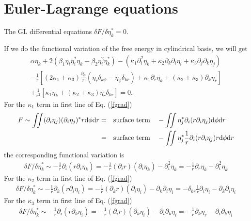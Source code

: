 \documentclass[aps,prl,preprint]{revtex4-2}
\begin{document}
\section{Euler-Lagrange equations}

The GL differential equations $\delta F/\delta\eta_k^*=0$.

If we do the functional variation of the free energy in cylindrical basis, we will get
\begin{align}
    \alpha\eta_k+2(\beta_1\eta_i\eta_i^*\eta_k
    +\beta_2\eta_i^2\eta_k^*)-\left(\kappa_1\partial_i^2\eta_k
    +\kappa_2\partial_k\partial_i\eta_i
    +\kappa_3\partial_j\partial_k\eta_j\right)\nonumber  \\
    -\frac{1}{r}\left[(2\kappa_1+\kappa_3)\frac{\partial_\phi}{r}
        \left(\eta_r\delta_{k\phi}-\eta_\phi\delta_{kr}\right)+\kappa_1\partial_r\eta_k
    +(\kappa_2+\kappa_3)\partial_k\eta_r\right]\nonumber \\
    +\frac{1}{r^2}[\kappa_1\eta_k+(\kappa_2+\kappa_3)\eta_r\delta_{kr}]
    =0.
\end{align}
For the $\kappa_1$ term in first line of Eq. (\ref{fgrad})
\begin{align}\label{surf_term}
    F\sim\iint (\partial_i\eta_j)(\partial_i\eta_j)^* r\dd\phi\dd r
    = & \qq{surface term} - \iint \eta_j^*\partial_i(r\partial_i\eta_j) \dd\phi\dd r             \\
    = & \qq{surface term} - \iint \eta_j^*\frac{1}{r}\partial_i(r\partial_i\eta_j) r\dd\phi\dd r
\end{align}
the corresponding functional variation is
\begin{align}
    \delta F/\delta\eta_k^*\sim-\frac{1}{r}\partial_i(r\partial_i\eta_k)
    =-\frac{1}{r}(\partial_i r)(\partial_i\eta_k)-\partial_i^2\eta_k
    =-\frac{1}{r}\partial_r\eta_k - \partial_i^2\eta_k
\end{align}
For the $\kappa_2$ term in first line of Eq. (\ref{fgrad})
\begin{align}
    \delta F/\delta\eta_k^*\sim-\frac{1}{r}\partial_k(r\partial_i\eta_i)
    =-\frac{1}{r}(\partial_k r)(\partial_i\eta_i)-\partial_k\partial_i\eta_i
    =-\delta_{kr}\frac{1}{r}\partial_i\eta_i - \partial_k\partial_i\eta_i
\end{align}
For the $\kappa_3$ term in first line of Eq. (\ref{fgrad})
\begin{align}
    \delta F/\delta\eta_k^*\sim-\frac{1}{r}\partial_i(r\partial_k\eta_i)
    =-\frac{1}{r}(\partial_i r)(\partial_k\eta_i)-\partial_i\partial_k\eta_i
    =-\frac{1}{r}\partial_k\eta_r - \partial_i\partial_k\eta_i
\end{align}
\end{document}
